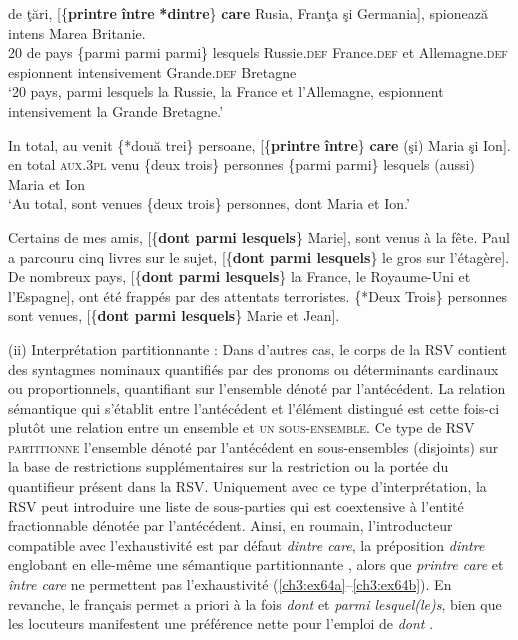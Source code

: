 \ex 
{}  de  ţări,  [\{\textbf{printre}  {\textbar}  \textbf{între}  {\textbar}  \textbf{*dintre}\}  \textbf{care} Rusia,  Franţa  şi  Germania], spionează  intens  Marea  Britanie. \label{ch3:ex62c}\\
20  de  pays  \{parmi  {\textbar}  parmi  {\textbar}  parmi\}  lesquels  Russie.\textsc{def}  France.\textsc{def}  et  Allemagne.\textsc{def} espionnent  intensivement  Grande.\textsc{def}  Bretagne \\
\glt ‘20 pays, parmi lesquels la Russie, la France et l’Allemagne, espionnent intensivement la Grande Bretagne.’

\ex 
\gll In  total,  au  venit  \{*două  {\textbar}  trei\}  persoane,  [\{\textbf{printre}  {\textbar}  \textbf{între}\} \textbf{care} (şi)  Maria  şi  Ion]. \label{ch3:ex62d}\\
en  total  \textsc{aux.3pl}  venu  \{deux  {\textbar}  trois\}  personnes  \{parmi  {\textbar}  parmi\}  lesquels (aussi)  Maria  et  Ion \\
\glt ‘Au total, sont venues \{deux {\textbar} trois\} personnes, dont Maria et Ion.’ 
\z 
\z


\ea \label{ch3:ex63} 
\ea
Certains de mes amis, [\{\textbf{dont {\textbar} parmi lesquels}\} Marie], sont venus à la fête. \label{ch3:ex63a}
\ex
Paul a parcouru cinq livres sur le sujet, [\{\textbf{dont {\textbar} parmi lesquels}\} le gros sur l'étagère]. \label{ch3:ex63b}
\ex 
De nombreux pays, [\{\textbf{dont {\textbar} parmi lesquels}\} la France, le Royaume-Uni et l’Espagne], ont été frappés par des attentats terroristes. \label{ch3:ex63c}
\ex 
\{*Deux {\textbar} Trois\} personnes sont venues, [\{\textbf{dont {\textbar} parmi lesquels}\}\textbf{} Marie et Jean]. \label{ch3:ex63d}
\z 
\z

(ii) Interprétation partitionnante : Dans d’autres cas, le corps de la RSV con\-tient des syntagmes nominaux quantifiés par des pronoms ou déterminants cardinaux ou proportionnels, quantifiant sur l’ensemble dénoté par l’antécédent. La relation sémantique qui s’établit entre l’antécédent et l’élément distingué est cette fois-ci plutôt une relation entre un ensemble et \textsc{un sous-ensemble}. Ce type de RSV \textsc{partitionne} l’ensemble dénoté par l’antécédent en sous-ensembles (disjoints) sur la base de restrictions supplémentaires sur la restriction ou la portée du quantifieur présent dans la RSV. Uniquement avec ce type d’interprétation, la RSV peut introduire une liste de sous-parties qui est coextensive à l’entité fractionnable dénotée par l’antécédent. Ainsi, en roumain, l’introducteur compatible avec l’exhaustivité est par défaut \textit{dintre care}, la préposition \textit{dintre} englobant en elle-même une sémantique partitionnante , alors que \textit{printre care} et \textit{între care} ne permettent pas l’exhaustivité (\ref{ch3:ex64a}--\ref{ch3:ex64b}). En revanche, le français permet a priori à la fois \textit{dont} et \textit{parmi lesquel(le)s}, bien que les locuteurs manifestent une préférence nette pour l’emploi de \textit{dont} . 

